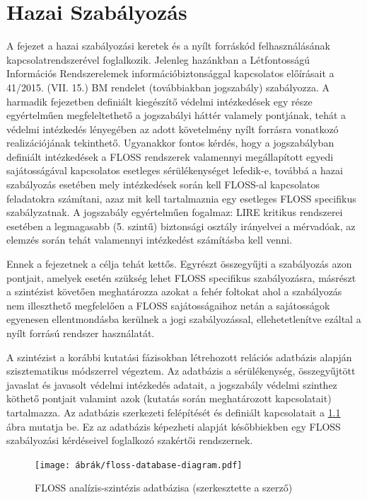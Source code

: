 \documentclass[12pt,magyar,a4paper,oneside]{scrreprt}
\begin{document}
\hypertarget{hazai-szabuxe1lyozuxe1s}{%
\chapter{Hazai Szabályozás}\label{hazai-szabuxe1lyozuxe1s}}

A fejezet a hazai szabályozási keretek és a nyílt forráskód
felhasználásának kapcsolatrendszerével foglalkozik. Jelenleg hazánkban a
Létfontosságú Információs Rendszerelemek információbiztonsággal
kapcsolatos előírásait a 41/2015. (VII. 15.) BM rendelet (továbbiakban
jogszabály) szabályozza. A harmadik fejezetben definiált kiegészítő
védelmi intézkedések egy része egyértelműen megfeleltethető a
jogszabályi háttér valamely pontjának, tehát a védelmi intézkedés
lényegében az adott követelmény nyílt forrásra vonatkozó realizációjának
tekinthető. Ugyanakkor fontos kérdés, hogy a jogszabályban definiált
intézkedések a FLOSS rendszerek valamennyi megállapított egyedi
sajátosságával kapcsolatos esetleges sérülékenységet lefedik-e, továbbá
a hazai szabályozás esetében mely intézkedések során kell FLOSS-al
kapcsolatos feladatokra számítani, azaz mit kell tartalmaznia egy
esetleges FLOSS specifikus szabályzatnak. A jogszabály egyértelműen
fogalmaz: LIRE kritikus rendszerei esetében a legmagasabb (5. szintű)
biztonsági osztály irányelvei a mérvadóak, az elemzés során tehát
valamennyi intézkedést számításba kell venni.

Ennek a fejezetnek a célja tehát kettős. Egyrészt összegyűjti a
szabályozás azon pontjait, amelyek esetén szükség lehet FLOSS specifikus
szabályozásra, másrészt a szintézist követően meghatározza azokat a
fehér foltokat ahol a szabályozás nem illeszthető megfelelően a FLOSS
sajátosságaihoz netán a sajátosságok egyenesen ellentmondásba kerülnek a
jogi szabályozással, ellehetetlenítve ezáltal a nyílt forrású rendszer
használatát.

A szintézist a korábbi kutatási fázisokban létrehozott relációs
adatbázis alapján szisztematikus módszerrel végeztem. Az adatbázis a
sérülékenység, összegyűjtött javaslat és javasolt védelmi intézkedés
adatait, a jogszabály védelmi szinthez köthető pontjait valamint azok
(kutatás során meghatározott kapcsolatait) tartalmazza. Az adatbázis
szerkezeti felépítését és definiált kapcsolatait a \ref{fig:FLOSSDB}
ábra mutatja be. Ez az adatbázis képezheti alapját későbbiekben egy
FLOSS szabályozási kérdéseivel foglalkozó szakértői rendszernek.

\begin{figure}
\hypertarget{fig:FLOSSDB}{%
\centering
\texttt{[image: ábrák/floss-database-diagram.pdf]}
\caption{FLOSS analízis-szintézis adatbázisa (szerkesztette a
szerző)}\label{fig:FLOSSDB}
}
\end{figure}
\end{document}
